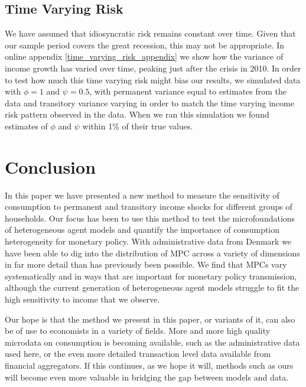 \documentclass[titlepage]{\econtex}\newcommand{\texname}{ConsumptionHeterogeneity}
\begin{document}
\subsection{Time Varying Risk} \label{time_varying_risk}
We have assumed that idiosyncratic risk remains constant over time. Given that our sample period covers the great recession, this may not be appropriate. In online appendix \ref{time_varying_risk_appendix} we show how the variance of income growth has varied over time, peaking just after the crisis in 2010. In order to test how much this time varying risk might bias our results, we simulated data with $\phi=1$ and $\psi=0.5$, with permanent variance equal to estimates from the data and transitory variance varying in order to match the time varying income risk pattern observed in the data. When we ran this simulation we found estimates of $\phi$ and $\psi$ within 1\% of their true values.

\FloatBarrier

\section{Conclusion}
In this paper we have presented a new method to measure the sensitivity of consumption to permanent and transitory income shocks for different groups of households. Our focus has been to use this method to test the microfoundations of heterogeneous agent models and quantify the importance of consumption heterogeneity for monetary policy. With administrative data from Denmark we have been able to dig into the distribution of MPC across a variety of dimensions in far more detail than has previously been possible. We find that MPCs vary systematically and in ways that are important for monetary policy transmission, although the current generation of heterogeneous agent models struggle to fit the high sensitivity to income that we observe.

Our hope is that the method we present in this paper, or variants of it, can also be of use to economists in a variety of fields. More and more high quality microdata on consumption is becoming available, such as the administrative data used here, or the even more detailed transaction level data available from financial aggregators. If this continues, as we hope it will, methods such as ours will become even more valuable in bridging the gap between models and data.





\processdelayedfloats
\end{document}

